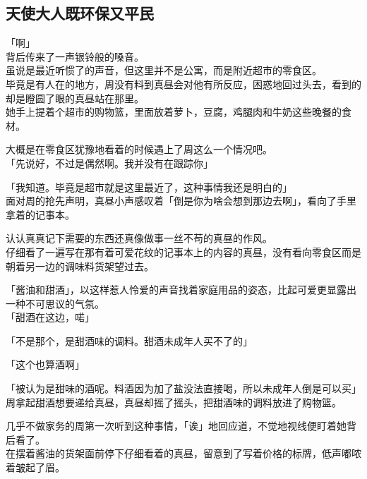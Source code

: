\subsection{天使大人既环保又平民}

「啊」\\

背后传来了一声银铃般的嗓音。\\

虽说是最近听惯了的声音，但这里并不是公寓，而是附近超市的零食区。\\

毕竟是有人在的地方，周没有料到真昼会对他有所反应，困惑地回过头去，看到的却是瞪圆了眼的真昼站在那里。\\

她手上提着个超市的购物篮，里面放着萝卜，豆腐，鸡腿肉和牛奶这些晚餐的食材。

大概是在零食区犹豫地看着的时候遇上了周这么一个情况吧。\\

「先说好，不过是偶然啊。我并没有在跟踪你」

「我知道。毕竟是超市就是这里最近了，这种事情我还是明白的」\\

面对周的抢先声明，真昼小声感叹着「倒是你为啥会想到那边去啊」，看向了手里拿着的记事本。

认认真真记下需要的东西还真像做事一丝不苟的真昼的作风。\\

仔细看了一遍写在那有着可爱花纹的记事本上的内容的真昼，没有看向零食区而是朝着另一边的调味料货架望过去。

「酱油和甜酒」，以这样惹人怜爱的声音找着家庭用品的姿态，比起可爱更显露出一种不可思议的气氛。\\

「甜酒在这边，喏」

「不是那个，是甜酒味的调料。甜酒未成年人买不了的」

「这个也算酒啊」

「被认为是甜味的酒呢。料酒因为加了盐没法直接喝，所以未成年人倒是可以买」\\

周拿起甜酒想要递给真昼，真昼却摇了摇头，把甜酒味的调料放进了购物篮。

几乎不做家务的周第一次听到这种事情，「诶」地回应道，不觉地视线便盯着她背后看了。\\

在摆着酱油的货架面前停下仔细看着的真昼，留意到了写着价格的标牌，低声嘟哝着皱起了眉。\\

